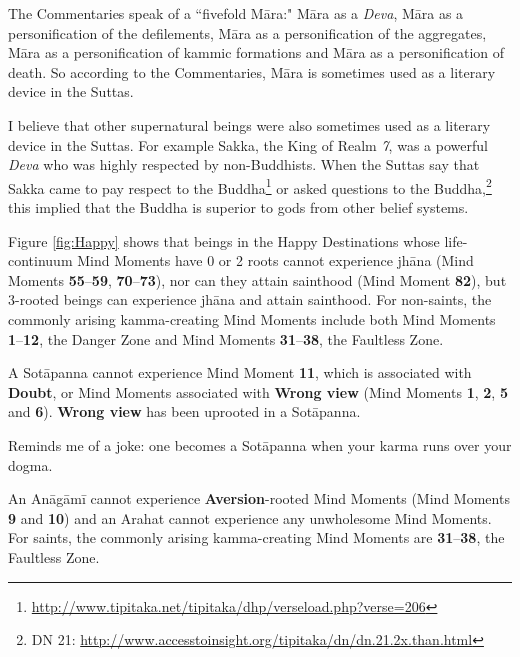 The Commentaries speak of a “fivefold Māra:" Māra as a \textit{Deva}, Māra as a personification of the defilements, Māra as a personification of the aggregates, Māra as a personification of kammic formations and Māra as a personification of death. So according to the Commentaries, Māra is sometimes used as a literary device in the Suttas.

I believe that other supernatural beings were also sometimes used as a literary device in the Suttas. For example Sakka, the King of Realm \textit{7}, was a powerful \textit{Deva} who was highly respected by non-Buddhists. When the Suttas say that Sakka came to pay respect to the Buddha\footnote{\url{http://www.tipitaka.net/tipitaka/dhp/verseload.php?verse=206}} or asked questions to the Buddha,\footnote{DN 21: \url{http://www.accesstoinsight.org/tipitaka/dn/dn.21.2x.than.html}} this implied that the Buddha is superior to gods from other belief systems.

Figure \ref{fig:Happy} shows that beings in the Happy Destinations whose life-continuum Mind Moments have 0 or 2 roots cannot experience jhāna (Mind Moments \textbf{55}--\textbf{59}, \textbf{70}--\textbf{73}), nor can they attain sainthood (Mind Moment \textbf{82}), but 3-rooted beings can experience jhāna and attain sainthood. For non-saints, the commonly arising kamma-creating Mind Moments include both Mind Moments \textbf{1}--\textbf{12}, the Danger Zone and Mind Moments \textbf{31}--\textbf{38}, the Faultless Zone.

A Sotāpanna cannot experience Mind Moment \textbf{11}, which is associated with \textbf{Doubt}, or Mind Moments associated with \textbf{Wrong view} (Mind Moments \textbf{1}, \textbf{2}, \textbf{5} and \textbf{6}). \textbf{Wrong view} has been uprooted in a Sotāpanna. 

Reminds me of a joke: one becomes a Sotāpanna when your karma runs over your dogma. 

An Anāgāmī cannot experience \textbf{Aversion}-rooted Mind Moments (Mind Moments \textbf{9} and \textbf{10}) and an Arahat cannot experience any unwholesome Mind Moments. For saints, the commonly arising kamma-creating Mind Moments are \textbf{31}--\textbf{38}, the Faultless Zone.

\pagebreak

